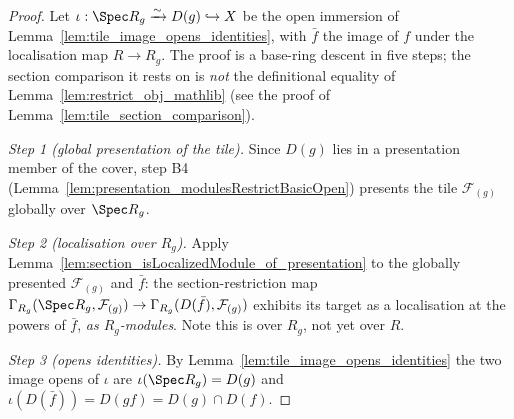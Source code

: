 \begin{proof}
  Let \(\iota : \Spec R_g \xrightarrow{\sim} D(g) \hookrightarrow X\) be the open immersion of
  Lemma~\ref{lem:tile_image_opens_identities}, with \(\bar f\) the image of \(f\) under the
  localisation map \(R \to R_g\). The proof is a base-ring descent in five steps; the section
  comparison it rests on is \emph{not} the definitional equality of
  Lemma~\ref{lem:restrict_obj_mathlib} (see the proof of
  Lemma~\ref{lem:tile_section_comparison}).

  \emph{Step 1 (global presentation of the tile).} Since \(D(g)\) lies in a presentation member of the
  cover, step B4 (Lemma~\ref{lem:presentation_modulesRestrictBasicOpen}) presents the tile
  \(\mathcal{F}_{(g)}\) globally over \(\Spec R_g\).

  \emph{Step 2 (localisation over \(R_g\)).} Apply
  Lemma~\ref{lem:section_isLocalizedModule_of_presentation} to the globally presented
  \(\mathcal{F}_{(g)}\) and \(\bar f\): the section-restriction map
  \(\Gamma_{R_g}(\Spec R_g, \mathcal{F}_{(g)}) \to \Gamma_{R_g}(D(\bar f), \mathcal{F}_{(g)})\)
  exhibits its target as a localisation at the powers of \(\bar f\), \emph{as \(R_g\)-modules}. Note this
  is over \(R_g\), not yet over \(R\).

  \emph{Step 3 (opens identities).} By Lemma~\ref{lem:tile_image_opens_identities} the two image opens of
  \(\iota\) are \(\iota(\Spec R_g) = D(g)\) and \(\iota(D(\bar f)) = D(gf) = D(g) \cap D(f)\).


\end{proof}
